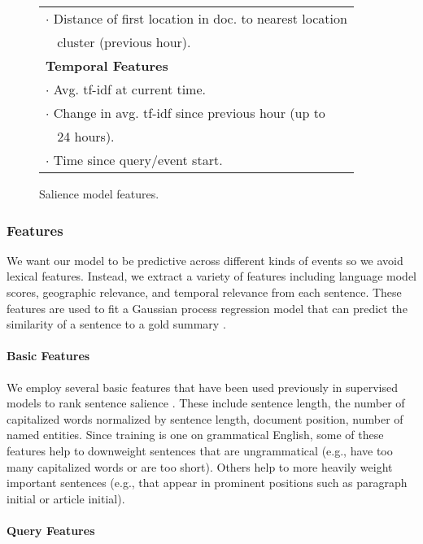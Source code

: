 \begin{figure}[t!]
\begin{tabular}{| l |}
$\cdot$ Distance of first location in doc. to nearest location \\
$\;\;$ cluster (previous hour).\\
\hline
\textbf{Temporal Features}\\
$\cdot$ Avg. tf-idf at current time.\\
$\cdot$ Change in avg. tf-idf since previous hour (up to\\
$\;\;$  24 hours).\\
$\cdot$ Time since query/event start.\\
\hline
\end{tabular}
\caption{Salience model features.}
\end{figure}

\subsubsection{Features}
We want our model to be predictive across different kinds of events so we avoid lexical features.  Instead, we extract a variety of features including language model scores, geographic relevance, and temporal relevance from each sentence.  These features are used to fit a Gaussian process regression model that can predict the similarity of a sentence to a gold summary \cite{preotiuc2013temporal}.  

\paragraph{Basic Features}

We employ several basic features that have been used previously in supervised models to rank sentence salience \cite{kupiec1995trainable,conroy2001using}. These include sentence length, the number of capitalized words normalized by sentence length, document position, number of named entities.  
Since training is one on grammatical English, some of these features help
to downweight sentences that are ungrammatical (e.g., have too many capitalized words or are too short).
Others help to more heavily weight important sentences (e.g., that appear in
prominent positions such as paragraph initial or article initial).

\paragraph{Query Features}

